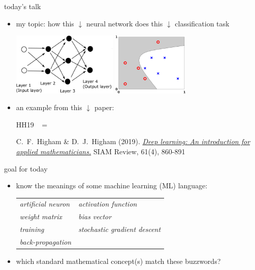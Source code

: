 \documentclass[xcolor={svgnames},
               hyperref={colorlinks,citecolor=DeepPink4,linkcolor=FireBrick,urlcolor=Maroon}]
               {beamer}
\begin{document}
\begin{frame}{today's talk}

\begin{itemize}
\item \alert{my topic:} {\small how this $\downarrow$ neural network does this $\downarrow$ classification task}

\medskip
\hspace{5mm} \includegraphics[height=30mm]{figs/network.png} \hfill \includegraphics[height=30mm]{figs/classification} \hspace{10mm}

\bigskip
\item an \alert{example} from this $\downarrow$ paper:

\medskip

HH19 \, $=$ \, 
\begin{minipage}[t]{0.75\textwidth} \footnotesize
C.~F.~Higham \& D.~J.~Higham (2019). \href{http://www.math.stonybrook.edu/~bishop/classes/math533.S21/MachineLearning/SIAMreview.pdf}{\emph{Deep learning: An introduction for applied mathematicians.}} SIAM Review, 61(4), 860-891
\end{minipage}
\end{itemize}
\end{frame}


\begin{frame}{goal for today}

\begin{itemize}
\item know the meanings of some machine learning (ML) language:

\medskip
\small
\qquad \begin{tabular}{ll}
\emph{artificial neuron} \qquad\qquad & \emph{activation function} \\
\emph{weight matrix} & \emph{bias vector} \\
\emph{training} & \emph{stochastic gradient descent} \\
\emph{back-propagation}
\end{tabular}

\medskip
\item which standard mathematical concept(s) match these buzzwords?
\end{itemize}
\end{frame}
\end{document}
